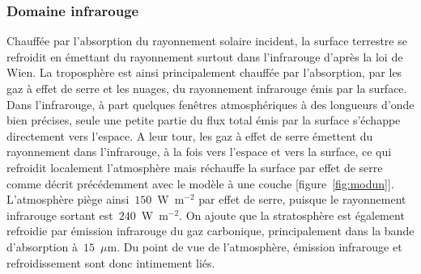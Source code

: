 \sk
\subsubsection{Domaine infrarouge}

\sk
Chauffée par l'absorption du rayonnement solaire incident, la surface terrestre se refroidit en émettant du rayonnement surtout dans l'infrarouge d'après la loi de Wien. La troposphère est ainsi principalement chauffée par l'absorption, par les gaz à effet de serre et les nuages, du rayonnement infrarouge émis par la surface. Dans l'infrarouge, à part quelques fenêtres atmosphériques à des longueurs d'onde bien précises, seule une petite partie du flux total émis par la surface s'échappe directement vers l'espace. A leur tour, les gaz à effet de serre émettent du rayonnement dans l'infrarouge, à la fois vers l'espace et vers la surface, ce qui refroidit localement l'atmosphère mais réchauffe la surface par effet de serre comme décrit précédemment avec le modèle à une couche [figure~\ref{fig:modun}]. L'atmosphère piège ainsi~$150$~W~m$^{-2}$ par effet de serre, puisque le rayonnement infrarouge sortant est~$240$~W~m$^{-2}$. On ajoute que la stratosphère est également refroidie par émission infrarouge du gaz carbonique, principalement dans la bande d'absorption à~$15$~$\mu$m. Du point de vue de l'atmosphère, émission infrarouge et refroidissement sont donc intimement liés.


